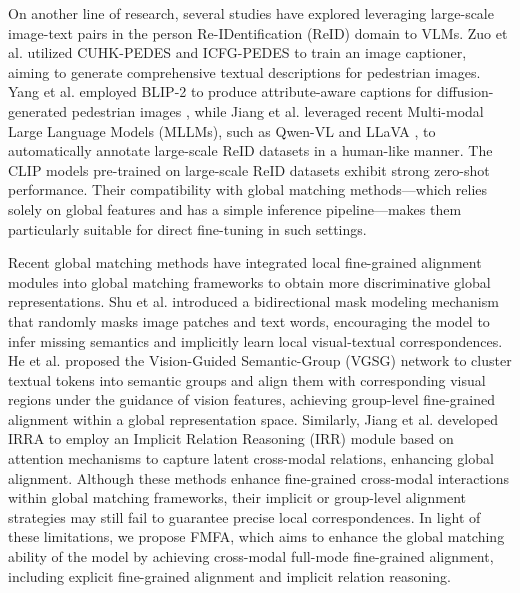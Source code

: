 \documentclass[acmsmall]{acmart}
\begin{document}
On another line of research, several studies \cite{yang2023towards,
shao2023unified, tan2024harnessing} have explored leveraging
large-scale image-text pairs in the person Re-IDentification (ReID)
domain to VLMs. Zuo et al. \cite{zuo2024plip} utilized CUHK-PEDES
and ICFG-PEDES to train an image captioner, aiming to generate
comprehensive textual descriptions for pedestrian images. Yang et
al. \cite{yang2023towards} employed BLIP-2 \cite{li2023blip2} to
produce attribute-aware captions for diffusion-generated pedestrian
images \cite{rombach2022high}, while Jiang et al.
\cite{jiang2025modeling} leveraged recent Multi-modal Large Language
Models (MLLMs), such as Qwen-VL \cite{bai2023qwenvl} and LLaVA
\cite{liu2024llavanext}, to automatically annotate large-scale ReID
datasets in a human-like manner. The CLIP models pre-trained on
large-scale ReID datasets exhibit strong zero-shot performance.
Their compatibility with global matching methods---which relies
solely on global features and has a simple inference
pipeline---makes them particularly suitable for direct fine-tuning
in such settings.

Recent global matching methods \cite{shu2022see, he23vgsg,
jiang2023cross} have integrated local fine-grained alignment modules
into global matching frameworks to obtain more discriminative global
representations. Shu et al. \cite{shu2022see} introduced a
bidirectional mask modeling mechanism that randomly masks image
patches and text words, encouraging the model to infer missing
semantics and implicitly learn local visual-textual correspondences.
He et al. \cite{he23vgsg} proposed the Vision-Guided Semantic-Group
(VGSG) network to cluster textual tokens into semantic groups and
align them with corresponding visual regions under the guidance of
vision features, achieving group-level fine-grained alignment within
a global representation space. Similarly, Jiang et al.
\cite{jiang2023cross} developed IRRA to employ an Implicit Relation
Reasoning (IRR) module based on attention mechanisms to capture
latent cross-modal relations, enhancing global alignment. Although
these methods enhance fine-grained cross-modal interactions within
global matching frameworks, their implicit or group-level alignment
strategies may still fail to guarantee precise local
correspondences. In light of these limitations, we propose FMFA,
which aims to enhance the global matching ability of the model by
achieving cross-modal full-mode fine-grained alignment, including
explicit fine-grained alignment and implicit relation reasoning.
\end{document}
